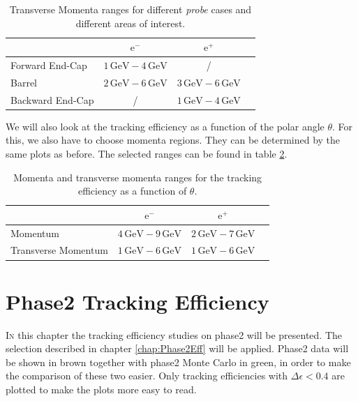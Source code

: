 \documentclass[a4paper,11pt,twosided,final,german,openbib,pdftex,listof=totoc,bibliography=totoc]{scrbook}
\begin{document}
\begin{table}[h!]
	\centering
	\begin{tabular}{lccc}
		&$\textrm{e}^-$ &$\textrm{e}^+$\\
		\hline
		Forward End-Cap &$1\,\textrm{GeV} - 4\,\textrm{GeV}$&/\\
		Barrel &$2\,\textrm{GeV} - 6\,\textrm{GeV}$&$3\,\textrm{GeV} - 6\,\textrm{GeV}$\\
		Backward End-Cap & /&$1\,\textrm{GeV} - 4\,\textrm{GeV}$\\
	\end{tabular}
	
	\caption[Areas Of Interest Different Transverse Momenta Ranges]{Transverse Momenta ranges for different \textit{probe} cases and different areas of interest.}
	\label{tab:RTPtMDTable}
\end{table}

We will also look at the tracking efficiency as a function of the polar angle $\theta$. For this, we also have to choose momenta regions. They can be determined by the same plots as before.
The selected ranges can be found in table \ref{tab:RTPMDThetaTable}.

\begin{table}[h!]
	\centering
	\begin{tabular}{lccc}
		&$\textrm{e}^-$ &$\textrm{e}^+$\\
		\hline
		Momentum &$4\,\textrm{GeV} - 9\,\textrm{GeV}$&$2\,\textrm{GeV} - 7\,\textrm{GeV}$\\
		Transverse Momentum &$1\,\textrm{GeV} - 6\,\textrm{GeV}$&$1\,\textrm{GeV} - 6\,\textrm{GeV}$\\

	\end{tabular}
	
	\caption[Different (Transverse-) Momenta Ranges For $\theta$ Efficiency]{Momenta and transverse momenta ranges for the tracking efficiency as a function of $\theta$.}
	\label{tab:RTPMDThetaTable}
\end{table}

\chapter{Phase2 Tracking Efficiency}
\label{chp:TrackingEfficiencyPhase2}



\lettrine{I}{n} this chapter the tracking efficiency studies on phase2 will be presented. The selection described in chapter \ref{chap:Phase2Eff} will be applied. Phase2 data will be shown in brown together with phase2 Monte Carlo in green, in order to make the comparison of these two easier.  Only tracking efficiencies with $\Delta \epsilon < 0.4$ are plotted to make the plots more easy to read. 
\newline
 
\end{document}
